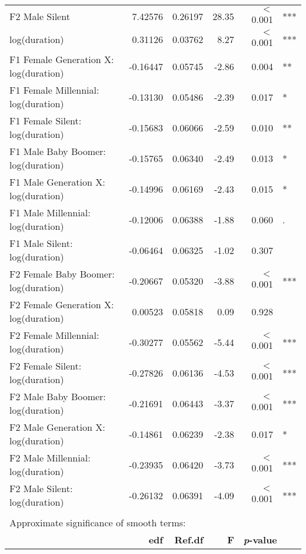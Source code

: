 \begin{table}[ht]
{{\begin{tabular}{l r r r r@{\hskip1pt} @{\hskip0pt}l}
{}F2 Male Silent               &  7.42576 &   0.26197 &  28.35 &     $<$ 0.001 & *** \\
log(duration)                                        &  0.31126 &   0.03762 &   8.27 &     $<$ 0.001 & *** \\
{}F1 Female Generation X: log(duration)        & -0.16447 &   0.05745 &  -2.86 &         0.004 & **  \\
{}F1 Female Millennial: log(duration)  & -0.13130 &   0.05486 &  -2.39 &         0.017 & *   \\
{}F1 Female Silent: log(duration)      & -0.15683 &   0.06066 &  -2.59 &         0.010 & **  \\
{}F1 Male Baby Boomer: log(duration)      & -0.15765 &   0.06340 &  -2.49 &         0.013 & *   \\
{}F1 Male Generation X: log(duration)        & -0.14996 &   0.06169 &  -2.43 &         0.015 & *   \\
{}F1 Male Millennial: log(duration)  & -0.12006 &   0.06388 &  -1.88 &         0.060 & .   \\
{}F1 Male Silent: log(duration)      & -0.06464 &   0.06325 &  -1.02 &         0.307 &     \\
{}F2 Female Baby Boomer: log(duration)      & -0.20667 &   0.05320 &  -3.88 &     $<$ 0.001 & *** \\
{}F2 Female Generation X: log(duration)        &  0.00523 &   0.05818 &   0.09 &         0.928 &     \\
{}F2 Female Millennial: log(duration)  & -0.30277 &   0.05562 &  -5.44 &     $<$ 0.001 & *** \\
{}F2 Female Silent: log(duration)      & -0.27826 &   0.06136 &  -4.53 &     $<$ 0.001 & *** \\
{}F2 Male Baby Boomer: log(duration)      & -0.21691 &   0.06443 &  -3.37 &     $<$ 0.001 & *** \\
{}F2 Male Generation X: log(duration)        & -0.14861 &   0.06239 &  -2.38 &         0.017 & *   \\
{}F2 Male Millennial: log(duration)  & -0.23935 &   0.06420 &  -3.73 &     $<$ 0.001 & *** \\
{}F2 Male Silent: log(duration)      & -0.26132 &   0.06391 &  -4.09 &     $<$ 0.001 & *** \\
\\
\multicolumn{6}{l}{Approximate significance of smooth terms:}\\
 & \textbf{edf} & \textbf{Ref.df} & \textbf{F} & \multicolumn{2}{l}{\textbf{\textit{p}-value}}\\

\end{tabular}}}
\end{table}
